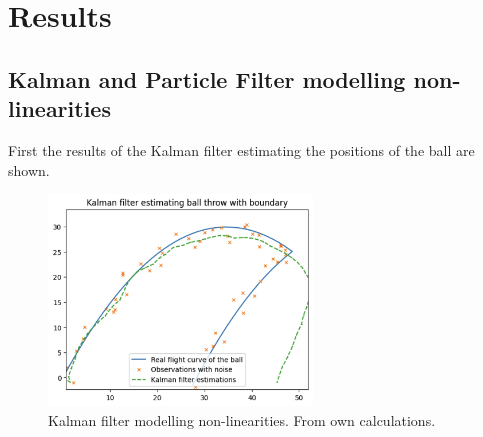 \documentclass[conference]{IEEEtran}
\begin{document}



\section{Results}



\subsection{Kalman and Particle Filter modelling non-linearities}

First the results of the Kalman filter estimating the positions of the ball are shown.   
\begin{figure}
	\centering
	\includegraphics[width=70mm]{figs/kalman-filter.png}
	\caption{Kalman filter modelling non-linearities. From own calculations.}
	\label{fig:kalman-filter}
\end{figure}
\end{document}

